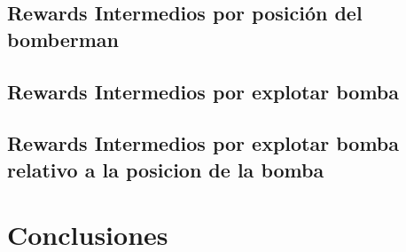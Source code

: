 \documentclass[a4paper,spanish] {article}
\begin{document}
	\subsection{Rewards Intermedios por posición del bomberman}
	\subsection{Rewards Intermedios por explotar bomba}
	\subsection{Rewards Intermedios por explotar bomba relativo a la posicion de la bomba}

\section{Conclusiones}


	





		


		
		

		
		
		
		
\newpage
\tableofcontents
\newpage
	 
	
\end{document}

